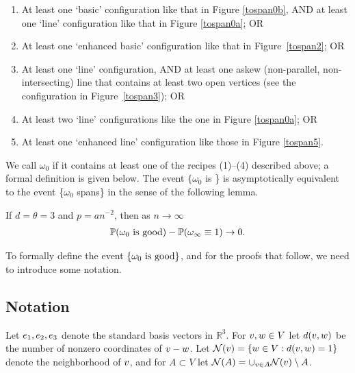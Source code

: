 \begin{enumerate}
\item At least one `basic' configuration like that in Figure \ref{tospan0b}, AND at least one `line' configuration like that in Figure \ref{tospan0a}; OR

\item At least one `enhanced basic' configuration like that in Figure~\ref{tospan2}; OR

\item At least one `line' configuration, AND at least one askew (non-parallel, non-intersecting) line that contains at least two open vertices (see the configuration in Figure~\ref{tospan3}); OR

\item At least two `line' configurations like the one in Figure \ref{tospan0a}; OR

\item At least one `enhanced line' configuration like those in Figure \ref{tospan5}.
\end{enumerate}
We call $\omega_0$ {\em \good} if it contains at least one of the recipes (1)--(4) described above; a formal definition is given below.  The event $\{\omega_0$ is \good\} is asymptotically equivalent to the event \{$\omega_0$ spans\} in the sense of the following lemma.
\begin{lemma} 
\label{good-span-lem}
If $d=\theta=3$ and $p=an^{-2}$, then as $n\to \infty$
\begin{align*}
\mathbb{P}(\omega_0 \text{ is } \text{good}){} - \mathbb{P}(\omega_\infty\equiv1) \to  0.
\end{align*}
\end{lemma}
To formally define the event $\{\omega_0 \text{ is } \text{good}\}$, and for the proofs that follow, we need to introduce some notation.

\subsection*{Notation}

Let ${ e_1}, { e_2}, { e_3}$ denote the standard basis vectors in $\mathbb{R}^3$.  For ${ v},{ w}\in V$ let $d({ v},{ w})$ be the number of nonzero coordinates of ${ v}-{ w}$.  Let $\mathcal{N}({ v}) = \{{ w} \in V: d({ v},{ w}) = 1\}$ denote the neighborhood of ${ v}$, and for $A\subset V$ let $\mathcal{N}(A) = \cup_{{ v}\in A}\mathcal{N}({ v}) \setminus A$.

